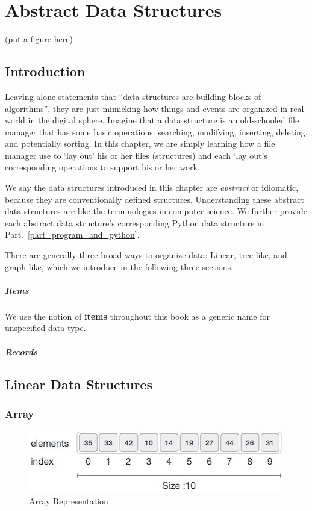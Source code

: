 \documentclass[../main.tex]{subfiles}
\begin{document}
\chapter{Abstract Data Structures}
\label{chapter_abstract_data_structure}
(put a figure here)


\section{Introduction}
\label{chapter_abstract_data_structure_introduction}
Leaving alone statements that ``data structures are building blocks of algorithms'', they are just mimicking how things and events are organized in real-world in the digital sphere. Imagine that a data structure is an old-schooled file manager that has some basic operations: searching, modifying, inserting, deleting, and potentially sorting. In this chapter, we are simply learning how a file manager use to `lay out' his or her files (structures) and each `lay out's corresponding operations to support his or her work. 

We say the data structures introduced in this chapter are \textit{abstract} or idiomatic, because they are conventionally defined structures. Understanding these abstract data structures are like the terminologies in computer science. We further provide each abstract data structure's corresponding Python data structure in Part.~\ref{part_program_and_python}.

There are generally three broad ways to organize data: Linear, tree-like, and graph-like, which we introduce in the following three sections.

\paragraph{Items} We use the notion of \textbf{items} throughout this book as a generic name for unspecified data type.

\paragraph{Records}
\section{Linear Data Structures}
\label{chapter_abstract_data_structure_linear_data_Strcuture}
\subsection{Array}
\begin{figure}[h!]
    \centering
    \includegraphics[width=0.7\columnwidth]{fig/array_representation.png}
    \caption{Array Representation}
    \label{fig:array_representation}
\end{figure}
\end{document}
